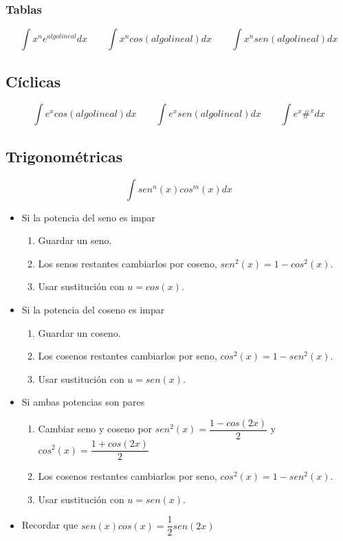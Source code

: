 \subsubsection{Tablas}

$$\int x^ne^{algo lineal}dx\qquad\int x^ncos(algo lineal)dx\qquad \int x^nsen(algo lineal)dx$$

\subsection{Cíclicas}

$$\int e^xcos(algo lineal)dx\qquad \int e^xsen(algo lineal)dx\qquad \int e^x\#^xdx$$
\subsection{Trigonométricas}
$$\int sen^n(x)cos^m(x)dx$$
\begin{itemize}
	\item Si la potencia del seno es impar
	\begin{enumerate}
		\item Guardar un seno.
		\item Los senos restantes cambiarlos por coseno, $sen^2(x)=1-cos^2(x)$.
		\item Usar sustitución con $u=cos(x)$.
	\end{enumerate}
	\item Si la potencia del coseno es impar
	\begin{enumerate}
		\item Guardar un coseno.
		\item Los cosenos restantes cambiarlos por seno, $cos^2(x)=1-sen^2(x)$.
		\item Usar sustitución con $u=sen(x)$.
	\end{enumerate}
	\item Si ambas potencias son pares
	\begin{enumerate}
		\item Cambiar seno y coseno por $sen^2(x)=\dfrac{1-cos(2x)}{2}$ y $cos^2(x)=\dfrac{1+cos(2x)}{2}$
		\item Los cosenos restantes cambiarlos por seno, $cos^2(x)=1-sen^2(x)$.
		\item Usar sustitución con $u=sen(x)$.
	\end{enumerate}
	\item Recordar que $sen(x)cos(x)=\dfrac{1}{2}sen(2x)$
\end{itemize}

